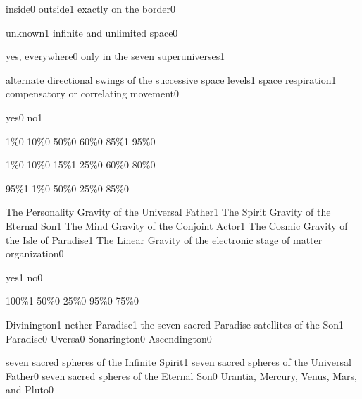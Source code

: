 {inside}{0}
{outside}{1}
{exactly on the border}{0}
\qstop

{unknown}{1}
{infinite and unlimited space}{0}
\qstop

{yes, everywhere}{0}
{only in the seven superuniverses}{1}
\qstop

{alternate directional swings of the successive space levels}{1}
{space respiration}{1}
{compensatory or correlating movement}{0}
\qstop

{yes}{0}
{no}{1}
\qstop

{1\%}{0}
{10\%}{0}
{50\%}{0}
{60\%}{0}
{85\%}{1}
{95\%}{0}
\qstop

{1\%}{0}
{10\%}{0}
{15\%}{1}
{25\%}{0}
{60\%}{0}
{80\%}{0}
\qstop

{95\%}{1}
{1\%}{0}
{50\%}{0}
{25\%}{0}
{85\%}{0}
\qstop

{The Personality Gravity of the Universal Father}{1}
{The Spirit Gravity of the Eternal Son}{1}
{The Mind Gravity of the Conjoint Actor}{1}
{The Cosmic Gravity of the Isle of Paradise}{1}
{The Linear Gravity of the electronic stage of matter organization}{0}
\qstop

{yes}{1}
{no}{0}
\qstop

{100\%}{1}
{50\%}{0}
{25\%}{0}
{95\%}{0}
{75\%}{0}
\qstop


{Divinington}{1}
{nether Paradise}{1}
{the seven sacred Paradise satellites of the Son}{1}
{Paradise}{0}
{Uversa}{0}
{Sonarington}{0}
{Ascendington}{0}
\qstop

{seven sacred spheres of the Infinite Spirit}{1}
{seven sacred spheres of the Universal Father}{0}
{seven sacred spheres of the Eternal Son}{0}
{Urantia, Mercury, Venus, Mars, and Pluto}{0}
\qstop

